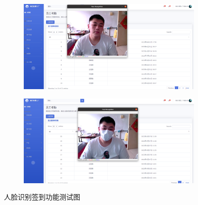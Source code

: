 \begin{figure}[H]
    \centering
    \begin{subfigure}{.45\textwidth}
        \centering
        \includegraphics[width=\textwidth]{figures/6facerecerror.png}
    \end{subfigure}
    \qquad
    \begin{subfigure}{.45\textwidth}
        \centering
        \includegraphics[width=\textwidth]{figures/6maskedfacerec.png}
    \end{subfigure}
    \caption{人脸识别签到功能测试图}
    \label{fig:fcrcgnttst}
\end{figure}